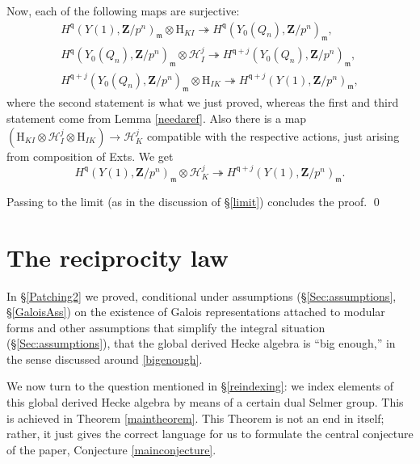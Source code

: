 \documentclass[10pt]{amsart}
\newcommand{\changecolor}{black}
\newcommand{\Z}{\mathbf{Z}}
\theoremstyle{remark}
\newcommand{\BWq}{\mathsf{q}}
\begin{document}
  
  Now,  each of the following maps are surjective:
\begin{eqnarray*}
H^{\BWq}(Y(1),\Z/p^n)_{\mathfrak{m}} \otimes \mathrm{H}_{KI} \twoheadrightarrow H^{\BWq}(Y_0(Q_n), \Z/p^n)_{\mathfrak{m}}, \\    H^{\BWq}(Y_0(Q_n), \Z/p^n)_{\mathfrak{m}} \otimes \mathscr{H}_I^j \twoheadrightarrow   H^{\BWq+j}(Y_0(Q_n), \Z/p^n)_{\mathfrak{m}},\\
H^{\BWq+j}(Y_0(Q_n) , \Z/p^n)_{\mathfrak{m}}\otimes \mathrm{H}_{IK} \twoheadrightarrow H^{\BWq+j}(Y(1),\Z/p^n)_{\mathfrak{m}}, \end{eqnarray*}
where the second statement is what we just proved, 
whereas the first and third statement come from Lemma \ref{needaref}.
Also there is a map  $\left( \mathrm{H}_{KI}  \otimes \mathscr{H}_I^j  \otimes \mathrm{H}_{IK} \right)  \rightarrow \mathscr{H}_K^j$ compatible with the respective actions, just arising  
from composition of Exts. We get  
$$   H^{\BWq}(Y(1), \Z/p^n)_{\mathfrak{m}}  \otimes  \mathscr{H}_K^j 
\twoheadrightarrow H^{\BWq+j}(Y(1), \Z/p^n)_{\mathfrak{m}}. $$

Passing to the limit (as in  the discussion of \S \ref{limit})    concludes the proof.  \qed

%
%
 



\section{The reciprocity law} \label{reciprocity} 


In \S \ref{Patching2} we proved, conditional under assumptions (\S \ref{Sec:assumptions}, \S \ref{GaloisAss}) on the existence of Galois representations attached to modular forms
and other assumptions that simplify the integral situation (\S \ref{Sec:assumptions}), 
that the global derived Hecke algebra is ``big enough,'' in the sense discussed around \eqref{bigenough}.  


We now turn to the question mentioned in \S \ref{reindexing}: 
we index elements of this global derived Hecke algebra by means of a certain dual Selmer group.
This is achieved in Theorem \ref{maintheorem}.  
This Theorem is not an end in itself; rather, it just gives the correct language for us to formulate the central conjecture of the paper, 
Conjecture \ref{mainconjecture}.
 
\end{document}
